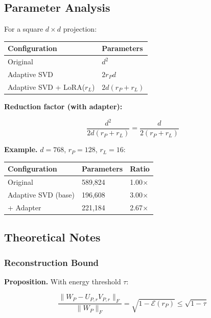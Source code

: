 \subsection{Parameter Analysis}

For a square $d \times d$ projection:

\begin{table}[H]
\centering
\small
\begin{tabular}{ll}
\toprule
\textbf{Configuration} & \textbf{Parameters} \\
\midrule
Original & $d^2$ \\
Adaptive SVD & $2 r_P d$ \\
Adaptive SVD + LoRA($r_L$) & $2 d (r_P + r_L)$ \\
\bottomrule
\end{tabular}
\end{table}

\textbf{Reduction factor (with adapter):}

\[
\frac{d^2}{2 d (r_P + r_L)} = \frac{d}{2(r_P + r_L)}
\tag{4.10}
\]

\textbf{Example.} $d = 768$, $r_P = 128$, $r_L = 16$:

\begin{table}[H]
\centering
\small
\begin{tabular}{lll}
\toprule
\textbf{Configuration} & \textbf{Parameters} & \textbf{Ratio} \\
\midrule
Original & 589,824 & 1.00$\times$ \\
Adaptive SVD (base) & 196,608 & 3.00$\times$ \\
+ Adapter & 221,184 & 2.67$\times$ \\
\bottomrule
\end{tabular}
\end{table}

\subsection{Theoretical Notes}

\subsubsection{Reconstruction Bound}

\textbf{Proposition.} With energy threshold $\tau$:

\[
\frac{\|W_P - U_{P, r} V_{P, r}\|_F}{\|W_P\|_F} = \sqrt{1 - \mathcal{E}(r_P)} \leq \sqrt{1 - \tau}
\tag{4.11}
\]

